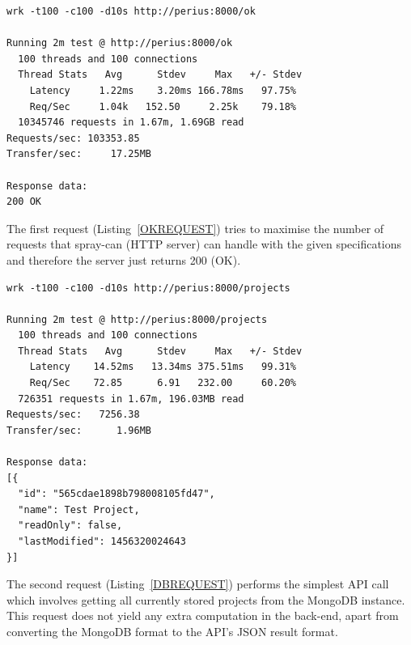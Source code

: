 \documentclass[a4paper,12pt]{article}
\newenvironment{custommargins}[2]%
  {\addtolength{\leftskip}{#1}\addtolength{\rightskip}{#2}}{\par}
\begin{document}
\begin{minipage}{\linewidth-1cm}
\begin{lstlisting}[label=OKREQUEST,caption=Result of OK requests]
wrk -t100 -c100 -d10s http://perius:8000/ok

Running 2m test @ http://perius:8000/ok
  100 threads and 100 connections
  Thread Stats   Avg      Stdev     Max   +/- Stdev
    Latency     1.22ms    3.20ms 166.78ms   97.75%
    Req/Sec     1.04k   152.50     2.25k    79.18%
  10345746 requests in 1.67m, 1.69GB read
Requests/sec: 103353.85
Transfer/sec:     17.25MB

Response data:
200 OK
\end{lstlisting}
\end{minipage}

\par
The first request (Listing~\ref{OKREQUEST}) tries to maximise the number of requests that spray-can
(HTTP server) can handle with the given specifications and therefore the server just returns 200
(OK).

\begin{custommargins}{0cm}{-2cm}
\begin{minipage}{\linewidth-1cm}
\begin{lstlisting}[label=DBREQUEST,caption=Result of MongoDB requests]
wrk -t100 -c100 -d10s http://perius:8000/projects

Running 2m test @ http://perius:8000/projects
  100 threads and 100 connections
  Thread Stats   Avg      Stdev     Max   +/- Stdev
    Latency    14.52ms   13.34ms 375.51ms   99.31%
    Req/Sec    72.85      6.91   232.00     60.20%
  726351 requests in 1.67m, 196.03MB read
Requests/sec:   7256.38
Transfer/sec:      1.96MB

Response data:
[{
  "id": "565cdae1898b798008105fd47",
  "name": Test Project,
  "readOnly": false,
  "lastModified": 1456320024643
}]
\end{lstlisting}
\end{minipage}
\end{custommargins}

\par
The second request (Listing~\ref{DBREQUEST}) performs the simplest API call which involves getting
all currently stored projects from the MongoDB instance. This request does not yield any extra
computation in the back-end, apart from converting the MongoDB format to the API's JSON result
format.
\end{document}
